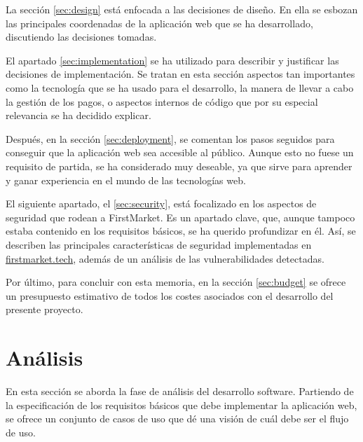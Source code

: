 \documentclass[a4paper]{article}
\begin{document}
    La sección \ref{sec:design} está enfocada a las decisiones de diseño. En ella se esbozan las principales coordenadas de la aplicación web que se ha desarrollado, discutiendo las decisiones tomadas.
    
    El apartado \ref{sec:implementation} se ha utilizado para describir y justificar las decisiones de implementación. Se tratan en esta sección aspectos tan importantes como la tecnología que se ha usado para el desarrollo, la manera de llevar a cabo la gestión de los pagos, o aspectos internos de código que por su especial relevancia se ha decidido explicar.
    
    Después, en la sección \ref{sec:deployment}, se comentan los pasos seguidos para conseguir que la aplicación web sea accesible al público. Aunque esto no fuese un requisito de partida, se ha considerado muy deseable, ya que sirve para aprender y ganar experiencia en el mundo de las tecnologías web.
    
    El siguiente apartado, el \ref{sec:security}, está focalizado en los aspectos de seguridad que rodean a FirstMarket. Es un apartado clave, que, aunque tampoco estaba contenido en los requisitos básicos, se ha querido profundizar en él. Así, se describen las principales características de seguridad implementadas en \href{https://firstmarket.tech}{firstmarket.tech}, además de un análisis de las vulnerabilidades detectadas.
    
    Por último, para concluir con esta memoria, en la sección \ref{sec:budget} se ofrece un presupuesto estimativo de todos los costes asociados con el desarrollo del presente proyecto.
    
    \section{Análisis} \label{sec:analysis}
    En esta sección se aborda la fase de análisis del desarrollo software. Partiendo de la especificación de los requisitos básicos que debe implementar la aplicación web, se ofrece un conjunto de casos de uso que dé una visión de cuál debe ser el flujo de uso.
    
\end{document}
